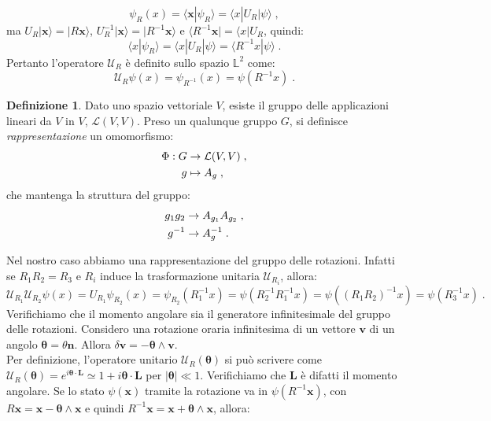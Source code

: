 \documentclass[12pt,a4paper]{report}
\theoremstyle{definition}
\newtheorem{dfn}{Definizione}[section]
\newcommand{\lag}{\mathcal{L}}
\numberwithin{equation}{section}
\newcommand{\bra}{\langle}
\newcommand{\ket}{\rangle}
\begin{document}
\begin{equation}
\psi_R(x)=\bra \mathbf{x}|\psi_R\ket=\bra x|U_R|\psi\ket\;,
\end{equation}
ma $U_R|\mathbf{x}\ket=|R\mathbf{x}\ket$, $U_R^{-1}|\mathbf{x}\ket=|R^{-1}\mathbf{x}\ket$ e $\bra R^{-1}\mathbf{x}|=\bra x|U_R$, quindi:
\begin{equation}
\bra x|\psi_R\ket=\bra x|U_R|\psi\ket=\bra R^{-1}x|\psi\ket\;.
\end{equation}
Pertanto l'operatore $\mathcal{U}_R$ è definito sullo spazio $\mathbb{L}^2$ come:
\begin{equation}
\mathcal{U}_R\psi(x)=\psi_{R^{-1}}(x)=\psi(R^{-1}x)\;.
\end{equation}
\begin{dfn} Dato uno spazio vettoriale $V$, esiste il gruppo delle applicazioni lineari da $V$ in $V$, $\lag(V,V)$. Preso un qualunque gruppo $G$, si definisce \textit{rappresentazione} un omomorfismo:
\begin{align}
\Phi:G&\to\lag(V,V) \notag\;, \\
g &\mapsto A_g\;,
\end{align}
che mantenga la struttura del gruppo:
\begin{align}
g_1g_2 &\to A_{g_1}A_{g_2}\;, \notag \\
g^{-1} &\to A_g^{-1}\;.
\end{align}
\end{dfn}
Nel nostro caso abbiamo una rappresentazione del gruppo delle rotazioni. Infatti se $R_1R_2=R_3$ e $R_i$ induce la trasformazione unitaria $\mathcal{U}_{R_i}$, allora:
\begin{equation}
\mathcal{U}_{R_1}\mathcal{U}_{R_2}\psi(x)=U_{R_1}\psi_{R_2}(x)=\psi_{R_2}(R_1^{-1}x)=\psi(R_2^{-1}R_1^{-1}x)=\psi((R_1R_2)^{-1}x)=\psi(R_3^{-1}x)\;.
\end{equation}
Verifichiamo che il momento angolare sia il generatore infinitesimale del gruppo delle rotazioni. Considero una rotazione oraria infinitesima di un vettore $\mathbf{v}$ di un angolo $\boldsymbol{\theta}=\theta\hat{\mathbf{n}}$. Allora
$\delta\mathbf{v}=-\boldsymbol{\theta}\wedge\mathbf{v}$. \\
Per definizione, l'operatore unitario $\mathcal{U}_R(\boldsymbol{\theta})$ si può scrivere come $\mathcal{U}_R(\boldsymbol{\theta})=e^{i\boldsymbol{\theta}\cdot\mathbf{L}}\simeq 1+i\boldsymbol{\theta}\cdot\mathbf{L}$ per $|\boldsymbol{\theta}|\ll 1$. Verifichiamo che $\mathbf{L}$ è difatti il momento angolare. Se lo stato $\psi(\mathbf{x})$ tramite la rotazione va in $\psi(R^{-1}\mathbf{x})$, con $R\mathbf{x}=\mathbf{x}-\boldsymbol{\theta}\wedge \mathbf{x}$ e quindi $R^{-1}\mathbf{x}=\mathbf{x}+\boldsymbol{\theta}\wedge\mathbf{x}$, allora:
\end{document}
